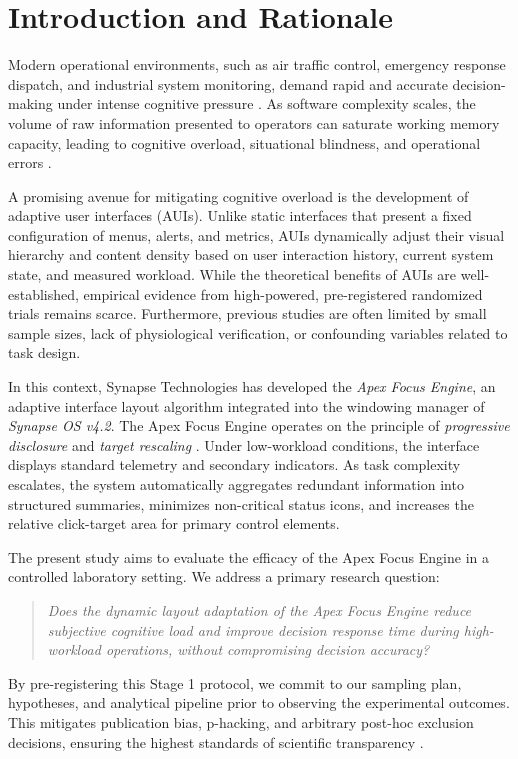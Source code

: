 \section{Introduction and Rationale}
\label{sec:intro}

Modern operational environments, such as air traffic control, emergency response dispatch, and industrial system monitoring, demand rapid and accurate decision-making under intense cognitive pressure \citep{sweller1988cognitive}. As software complexity scales, the volume of raw information presented to operators can saturate working memory capacity, leading to cognitive overload, situational blindness, and operational errors \citep{paas2003cognitive}.

A promising avenue for mitigating cognitive overload is the development of adaptive user interfaces (AUIs). Unlike static interfaces that present a fixed configuration of menus, alerts, and metrics, AUIs dynamically adjust their visual hierarchy and content density based on user interaction history, current system state, and measured workload. While the theoretical benefits of AUIs are well-established, empirical evidence from high-powered, pre-registered randomized trials remains scarce. Furthermore, previous studies are often limited by small sample sizes, lack of physiological verification, or confounding variables related to task design.

In this context, Synapse Technologies has developed the \emph{Apex Focus Engine}, an adaptive interface layout algorithm integrated into the windowing manager of \emph{Synapse OS v4.2}. The Apex Focus Engine operates on the principle of \emph{progressive disclosure} and \emph{target rescaling} \citep{jenkins2024adaptive}. Under low-workload conditions, the interface displays standard telemetry and secondary indicators. As task complexity escalates, the system automatically aggregates redundant information into structured summaries, minimizes non-critical status icons, and increases the relative click-target area for primary control elements.

The present study aims to evaluate the efficacy of the Apex Focus Engine in a controlled laboratory setting. We address a primary research question:
\begin{quote}
\textit{Does the dynamic layout adaptation of the Apex Focus Engine reduce subjective cognitive load and improve decision response time during high-workload operations, without compromising decision accuracy?}
\end{quote}

By pre-registering this Stage 1 protocol, we commit to our sampling plan, hypotheses, and analytical pipeline prior to observing the experimental outcomes. This mitigates publication bias, p-hacking, and arbitrary post-hoc exclusion decisions, ensuring the highest standards of scientific transparency \citep{nosek2018preregistration}.
